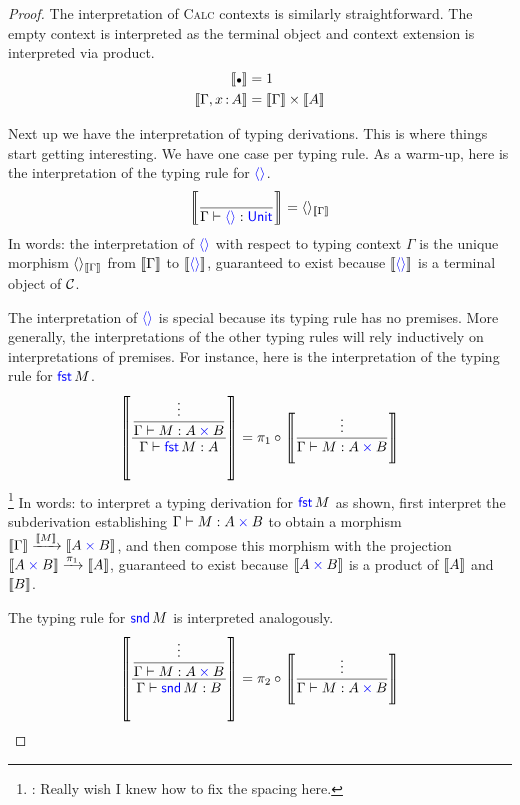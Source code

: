 \begin{proof}
  The interpretation of \textsc{Calc} contexts is similarly straightforward.
  The empty context is interpreted as the terminal object
  and context extension is interpreted via product.
  \begin{align}
    \llbr{\ctxemp} &= 1 \\
    \llbr{\Gamma, x\ofty A} &= \llbr{\Gamma} \times \llbr{A}
  \end{align}

  Next up we have the interpretation of typing derivations.
  This is where things start getting interesting.
  We have one case per typing rule. As a warm-up,
  here is the interpretation of the typing rule for \({{\color{blue}\langle \rangle}}\).
  \begin{align}
    \left\llbracket 
      \frac
        {~}
        {\Gamma \vdash {{\color{blue}\langle \rangle}} : \mathsf{{\color{blue}Unit}}}
    \right\rrbracket
    = \langle \rangle_{\left\llbracket \Gamma\right\rrbracket}
  \end{align}
  In words: the interpretation of \({{\color{blue}\langle \rangle}}\)
  with respect to typing context \(\Gamma\)
  is the unique morphism \(\langle \rangle_{\left\llbracket \Gamma\right\rrbracket}\)
  from \(\left\llbracket \Gamma\right\rrbracket\) to \(\left\llbracket {{\color{blue}\langle \rangle}}\right\rrbracket\),
  guaranteed to exist because \(\left\llbracket {{\color{blue}\langle \rangle}}\right\rrbracket\)
  is a terminal object of \(\mathcal C\).

  The interpretation of \({{\color{blue}\langle \rangle}}\) is special because its typing rule has no premises.
  More generally, the interpretations of the other typing rules
  will rely inductively on interpretations of premises.
  For instance, here is the interpretation of the typing rule for \(\mathsf{{\color{blue}fst}}\,M\).
  \begin{align}
    \left\llbracket 
      \displaystyle\frac
        {\displaystyle\frac{\vdots}{{{{\Gamma \vdash M : A \mathbin{{\color{blue}\times}} B}}}}}
        {\Gamma \vdash \mathsf{{\color{blue}fst}}\,M : A}
    \right\rrbracket
    = \pi_1 \circ \left\llbracket \frac{\vdots}{\Gamma \vdash M : A \mathbin{{\color{blue}\times}} B}\right\rrbracket
  \end{align}
  \footnote{\todo: Really wish I knew how to fix the spacing here.}
  In words: to interpret a typing derivation for \(\mathsf{{\color{blue}fst}}\,M\)
  as shown, first interpret the subderivation
  establishing \(\Gamma \vdash M : A \mathbin{{\color{blue}\times}} B\)
  to obtain a morphism \(\left\llbracket \Gamma\right\rrbracket \xrightarrow{\left\llbracket M\right\rrbracket} \left\llbracket A\mathbin{{\color{blue}\times}} B\right\rrbracket\),
  and then compose this morphism with the projection
  \(\left\llbracket A\mathbin{{\color{blue}\times}} B\right\rrbracket \xrightarrow{\pi_1} \left\llbracket A\right\rrbracket\),
  guaranteed to exist because \(\left\llbracket A \mathbin{{\color{blue}\times}} B\right\rrbracket\)
  is a product of \(\left\llbracket A\right\rrbracket\) and \(\left\llbracket B\right\rrbracket\).

  The typing rule for \(\mathsf{{\color{blue}snd}}\,M\) is interpreted analogously.
  \begin{align}
    \left\llbracket 
      \displaystyle\frac
        {\displaystyle\frac{\vdots}{{{{\Gamma \vdash M : A \mathbin{{\color{blue}\times}} B}}}}}
        {\Gamma \vdash \mathsf{{\color{blue}snd}}\,M : B}
    \right\rrbracket
    = \pi_2 \circ \left\llbracket \frac{\vdots}{\Gamma \vdash M : A \mathbin{{\color{blue}\times}} B}\right\rrbracket
  \end{align}


\end{proof}
